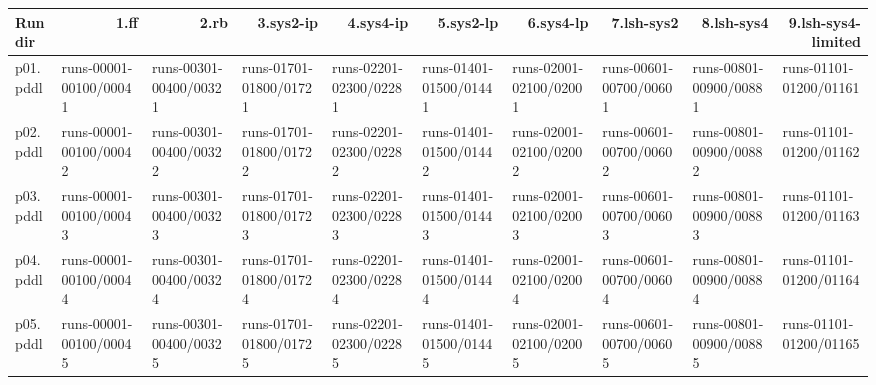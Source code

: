 \documentclass{article}
\begin{document}
\begin{tabular}{@{}lrrrrrrrrr@{}}
Run dir & 1.ff & 2.rb & 3.sys2-ip & 4.sys4-ip & 5.sys2-lp & 6.sys4-lp & 7.lsh-sys2 & 8.lsh-sys4 & 9.lsh-sys4-limited \\
\midrule
p01.pddl & \multicolumn{1}{|l|}{runs-00001-00100/00041} & \multicolumn{1}{|l|}{runs-00301-00400/00321} & \multicolumn{1}{|l|}{runs-01701-01800/01721} & \multicolumn{1}{|l|}{runs-02201-02300/02281} & \multicolumn{1}{|l|}{runs-01401-01500/01441} & \multicolumn{1}{|l|}{runs-02001-02100/02001} & \multicolumn{1}{|l|}{runs-00601-00700/00601} & \multicolumn{1}{|l|}{runs-00801-00900/00881} & \multicolumn{1}{|l|}{runs-01101-01200/01161} \\
p02.pddl & \multicolumn{1}{|l|}{runs-00001-00100/00042} & \multicolumn{1}{|l|}{runs-00301-00400/00322} & \multicolumn{1}{|l|}{runs-01701-01800/01722} & \multicolumn{1}{|l|}{runs-02201-02300/02282} & \multicolumn{1}{|l|}{runs-01401-01500/01442} & \multicolumn{1}{|l|}{runs-02001-02100/02002} & \multicolumn{1}{|l|}{runs-00601-00700/00602} & \multicolumn{1}{|l|}{runs-00801-00900/00882} & \multicolumn{1}{|l|}{runs-01101-01200/01162} \\
p03.pddl & \multicolumn{1}{|l|}{runs-00001-00100/00043} & \multicolumn{1}{|l|}{runs-00301-00400/00323} & \multicolumn{1}{|l|}{runs-01701-01800/01723} & \multicolumn{1}{|l|}{runs-02201-02300/02283} & \multicolumn{1}{|l|}{runs-01401-01500/01443} & \multicolumn{1}{|l|}{runs-02001-02100/02003} & \multicolumn{1}{|l|}{runs-00601-00700/00603} & \multicolumn{1}{|l|}{runs-00801-00900/00883} & \multicolumn{1}{|l|}{runs-01101-01200/01163} \\
p04.pddl & \multicolumn{1}{|l|}{runs-00001-00100/00044} & \multicolumn{1}{|l|}{runs-00301-00400/00324} & \multicolumn{1}{|l|}{runs-01701-01800/01724} & \multicolumn{1}{|l|}{runs-02201-02300/02284} & \multicolumn{1}{|l|}{runs-01401-01500/01444} & \multicolumn{1}{|l|}{runs-02001-02100/02004} & \multicolumn{1}{|l|}{runs-00601-00700/00604} & \multicolumn{1}{|l|}{runs-00801-00900/00884} & \multicolumn{1}{|l|}{runs-01101-01200/01164} \\
p05.pddl & \multicolumn{1}{|l|}{runs-00001-00100/00045} & \multicolumn{1}{|l|}{runs-00301-00400/00325} & \multicolumn{1}{|l|}{runs-01701-01800/01725} & \multicolumn{1}{|l|}{runs-02201-02300/02285} & \multicolumn{1}{|l|}{runs-01401-01500/01445} & \multicolumn{1}{|l|}{runs-02001-02100/02005} & \multicolumn{1}{|l|}{runs-00601-00700/00605} & \multicolumn{1}{|l|}{runs-00801-00900/00885} & \multicolumn{1}{|l|}{runs-01101-01200/01165} \\

\end{tabular}
\end{document}
